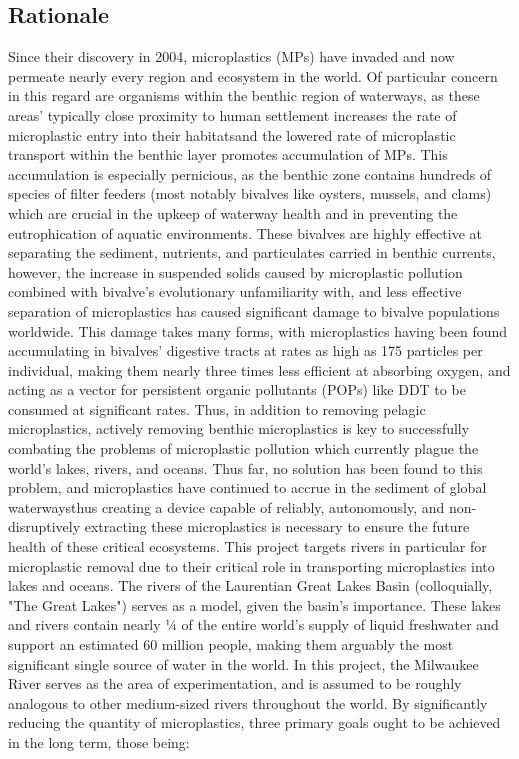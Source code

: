 \documentclass[fleqn,10pt]{SelfArx} %
\begin{document}
	\subsection{Rationale}
	Since their discovery in 2004, microplastics (MPs) have invaded and now permeate nearly every region and ecosystem in the world. Of particular concern in this regard are organisms within the \gls{benthic} region of waterways, as these areas’ typically close proximity to human settlement increases the rate of microplastic entry into their habitats\textemdash and the lowered rate of microplastic transport within the \gls{benthic} layer promotes accumulation of MPs. This accumulation is especially pernicious, as the \gls{benthic} zone contains hundreds of species of filter feeders (most notably bivalves like oysters, mussels, and clams) which are crucial in the upkeep of waterway health and in preventing the eutrophication of aquatic environments. These bivalves are highly effective at separating the sediment, nutrients, and particulates carried in \gls{benthic} currents, however, the increase in suspended solids caused by microplastic pollution combined with bivalve’s evolutionary unfamiliarity with, and less effective separation of microplastics has caused significant damage to bivalve populations worldwide. This damage takes many forms, with microplastics having been found accumulating in bivalves' digestive tracts at rates as high as 175 particles per individual, making them nearly three times less efficient at absorbing oxygen, and acting as a vector for persistent organic pollutants (POPs) like DDT to be consumed at significant rates. Thus, in addition to removing \gls{pelagic} microplastics, actively removing \gls{benthic} microplastics is key to successfully combating the problems of microplastic pollution which currently plague the world’s lakes, rivers, and oceans. Thus far, no solution has been found to this problem, and microplastics have continued to accrue in the sediment of global waterways\textemdash thus creating a device capable of reliably, autonomously, and non-disruptively extracting these microplastics is necessary to ensure the future health of these critical ecosystems. This project targets rivers in particular for microplastic removal due to their critical role in transporting microplastics into lakes and oceans. The rivers of the Laurentian Great Lakes Basin (colloquially, "The Great Lakes") serves as a model, given the basin’s importance. These lakes  and rivers contain nearly ¼ of the entire world’s supply of liquid freshwater and support an estimated 60 million people, making them arguably the most significant single source of water in the world. In this project, the Milwaukee River serves as the area of experimentation, and is assumed to be roughly analogous to other medium-sized rivers throughout the world. By significantly reducing the quantity of microplastics, three primary goals ought to be achieved in the long term, those being: 
\end{document}
